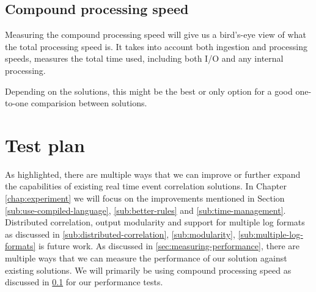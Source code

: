 \subsection{Compound processing speed}
\label{sub:compound-processing-speed}

Measuring the compound processing speed will give us a bird's-eye view of what the total processing speed is. It takes into account both ingestion and processing speeds, measures the total time used, including both I/O and any internal processing.

Depending on the solutions, this might be the best or only option for a good one-to-one comparision between solutions.


\section{Test plan}
As highlighted, there are multiple ways that we can improve or further expand the capabilities of existing real time event correlation solutions. In Chapter \ref{chap:experiment} we will focus on the improvements mentioned in Section \ref{sub:use-compiled-language}, \ref{sub:better-rules} and \ref{sub:time-management}. Distributed correlation, output modularity and support for multiple log formats as discussed in \ref{sub:distributed-correlation}, \ref{sub:modularity}, \ref{sub:multiple-log-formats} is future work.
As discussed in \ref{sec:measuring-performance}, there are multiple ways that we can measure the performance of our solution against existing solutions. We will primarily be using compound processing speed as discussed in \ref{sub:compound-processing-speed} for our performance tests.

